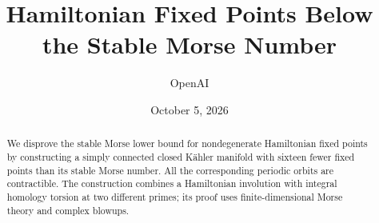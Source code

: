\documentclass[11pt]{amsart}
\title{Hamiltonian Fixed Points Below the Stable Morse Number}
\author{OpenAI}
\date{October 5, 2026}
\theoremstyle{definition}
\theoremstyle{remark}
\numberwithin{equation}{section}
\begin{document}
\begin{abstract}
We disprove the stable Morse lower bound for nondegenerate Hamiltonian fixed points by constructing a simply connected closed Kähler manifold with sixteen fewer fixed points than its stable Morse number. All the corresponding periodic orbits are contractible. The construction combines a Hamiltonian involution with integral homology torsion at two different primes; its proof uses finite-dimensional Morse theory and complex blowups.
\end{abstract}
\maketitle






\appendix

\clearpage

\end{document}
